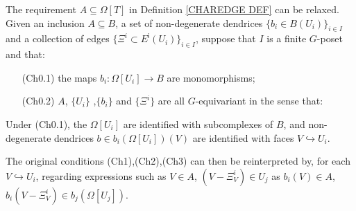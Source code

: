 \documentclass[a4paper,10pt
,draft
]{article}%
\begin{document}
\begin{remark}\label{CHAREDGE2 REM}
The requirement $A \subseteq \Omega[T]$ in Definition \ref{CHAREDGE DEF} can be relaxed.
Given an inclusion $A \subseteq B$,
a set of non-degenerate dendrices
$\{b_i \in B(U_i)\}_{i \in I}$
and a collection of edges
$\{\Xi^i \subset E^{\mathsf{i}}(U_i)\}_{i \in I}$, 
suppose that $I$ is a finite $G$-poset and that:
\begin{itemize}
	\item[(Ch0.1)] the maps $b_i \colon \Omega[U_i] \to B$ are monomorphisms;
	\item[(Ch0.2)] $A$, $\{U_i\}$ ,$\{b_i\}$ and $\{\Xi^i\}$
	are all $G$-equivariant in the sense that:
\end{itemize}
Under (Ch0.1),
the $\Omega[U_i]$ are identified with subcomplexes of $B$,
and non-degenerate dendrices $b \in b_i(\Omega[U_i])(V)$
are identified with faces $V \hookrightarrow U_i$.

The original conditions (Ch1),(Ch2),(Ch3) can then be reinterpreted by, 
for each $V \hookrightarrow U_i$, 
regarding expressions such as $V \in A$, $(V-\Xi^i_V)\in U_j$
as $b_i(V) \in A$, $b_i(V-\Xi^i_V) \in b_j(\Omega[U_j])$.


\end{remark}
\end{document}
